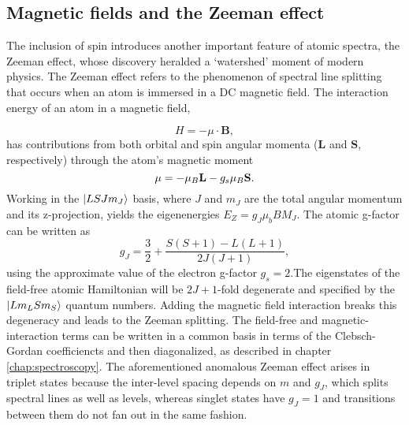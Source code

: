 	

	
	

\subsection*{Magnetic fields and the Zeeman effect}

	The inclusion of spin introduces another important feature of atomic spectra, the Zeeman effect, whose discovery heralded a `watershed' moment of modern physics.
	The Zeeman effect refers to the phenomenon of spectral line splitting that occurs when an atom is immersed in a DC magnetic field.
	The interaction energy of an atom in a magnetic field, 
	
	\begin{equation}
		H = -\mu\cdot \textbf{B},
	\end{equation}
	has contributions from both orbital and spin angular momenta ($\textbf{L}$ and $\textbf{S}$, respectively) through the atom's magnetic moment 
	\begin{equation}
		{\bf \mu} = -\mu_B\textbf{L} - g_s\mu_B \textbf{S}.
	\end{equation}
	Working in the $|LSJm_J\rangle$ basis, where $J$ and $m_J$ are the total angular momentum and its z-projection, yields the eigenenergies $E_Z = g_J \mu_b B M_J$.
	The atomic g-factor can be written as
	\begin{equation}
		g_J = \frac{3}{2} + \frac{S(S+1)-L(L+1)}{2J(J+1)},
	\end{equation}
	using the approximate value of the electron g-factor $g_s=2$.The eigenstates of the field-free atomic Hamiltonian will be $2J+1$-fold degenerate and specified by the $|Lm_L S m_S\rangle$ quantum numbers.
	Adding the magnetic field interaction breaks this degeneracy and leads to the Zeeman splitting.
	The field-free and magnetic-interaction terms can be written in a common basis in terms of the Clebsch-Gordan coefficiencts and then diagonalized, as described in chapter \ref{chap:spectroscopy}.
	The aforementioned anomalous Zeeman effect arises in triplet states because the inter-level spacing depends on $m$ and $g_J$, which splits spectral lines as well as levels, whereas singlet states have $g_J=1$ and transitions between them do not fan out in the same fashion.
	
